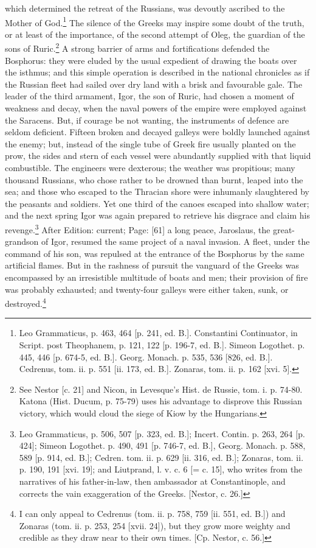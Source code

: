 which determined the retreat of the Russians, was devoutly ascribed to the Mother of God.\footnote{Leo Grammaticus, p. 463, 464 [p. 241, ed. B.]. Constantini Continuator, in Script. post Theophanem, p. 121, 122 [p. 196-7, ed. B.]. Simeon Logothet. p. 445, 446 [p. 674-5, ed. B.]. Georg. Monach. p. 535, 536 [826, ed. B.]. Cedrenus, tom. ii. p. 551 [ii. 173, ed. B.]. Zonaras, tom. ii. p. 162 [xvi. 5].} The silence of the Greeks may inspire some doubt of the truth, or at least of the importance, of the second attempt of Oleg, the guardian of the sons of Ruric.\footnote{See Nestor [c. 21] and Nicon, in Levesque\texthebrew{}’s Hist. de Russie, tom. i. p. 74-80. Katona (Hist. Ducum, p. 75-79) uses his advantage to disprove this Russian victory, which would cloud the siege of Kiow by the Hungarians.} A strong barrier of arms and fortifications defended the Bosphorus: they were eluded by the usual expedient of drawing the boats over the isthmus; and this simple operation is described in the national chronicles as if the Russian fleet had sailed over dry land with a brisk and favourable gale. The leader of the third armament, Igor, the son of Ruric, had chosen a moment of weakness and decay, when the naval powers of the empire were employed against the Saracens. But, if courage be not wanting, the instruments of defence are seldom deficient. Fifteen broken and decayed galleys were boldly launched against the enemy; but, instead of the single tube of Greek fire usually planted on the prow, the sides and stern of each vessel were abundantly supplied with that liquid combustible. The engineers were dexterous; the weather was propitious; many thousand Russians, who chose rather to be drowned than burnt, leaped into the sea; and those who escaped to the Thracian shore were inhumanly slaughtered by the peasants and soldiers. Yet one third of the canoes escaped into shallow water; and the next spring Igor was again prepared to retrieve his disgrace and claim his revenge.\footnote{Leo Grammaticus, p. 506, 507 [p. 323, ed. B.]; Incert. Contin. p. 263, 264 [p. 424]; Simeon Logothet. p. 490, 491 [p. 746-7, ed. B.], Georg. Monach. p. 588, 589 [p. 914, ed. B.]; Cedren. tom. ii. p. 629 [ii. 316, ed. B.]; Zonaras, tom. ii. p. 190, 191 [xvi. 19]; and Liutprand, l. v. c. 6 [= c. 15], who writes from the narratives of his father-in-law, then ambassador at Constantinople, and corrects the vain exaggeration of the Greeks. [Nestor, c. 26.]} After Edition: current; Page: [61] a long peace, Jaroslaus, the great-grandson of Igor, resumed the same project of a naval invasion. A fleet, under the command of his son, was repulsed at the entrance of the Bosphorus by the same artificial flames. But in the rashness of pursuit the vanguard of the Greeks was encompassed by an irresistible multitude of boats and men; their provision of fire was probably exhausted; and twenty-four galleys were either taken, sunk, or destroyed.\footnote{I can only appeal to Cedrenus (tom. ii. p. 758, 759 [ii. 551, ed. B.]) and Zonaras (tom. ii. p. 253, 254 [xvii. 24]), but they grow more weighty and credible as they draw near to their own times. [Cp. Nestor, c. 56.]}

